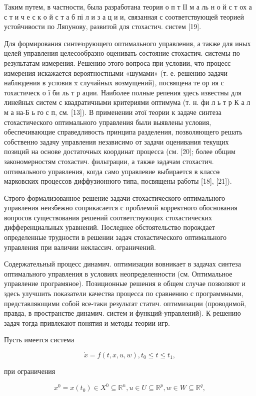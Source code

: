 \documentclass[10pt]{article}
\begin{document}
Таким путем, в частности, была разработана теория $о$ п т ІІ м а ль н о й с т ох а с т и ч е с к о й с т а б пі л и з а ц и и, связанная с соответствующей теориеӥ устоӥчивости по Ляпунову, развитой для стохастич. систем [19].

Для формирования синтезıрующего оптимального управления, а также для иных целей управления целесообразно оценивать состояние стохастич. системы по результатам измерения. Решению этого вопроса при условии, что процесс измерения искажается вероятностными «шумами» (т. е. решению задачи наблюдения в условия $\mathrm{x}$ случайных возмущений), посвящена те ор ия с тохастическ о ї би ль т р ации. Наиболее полные репения здесь известны для линейных систем с квадратичными критериями оптимума (т. н. фи л ь т р К а л м а на-Б ь го с п, см. [13]). В применении әтої теории к задаче синтеза стохастического оптимального управления были выявлены условия, обеспечивающие справедливость принципа разделения, позволяющего решать собственно задачу управления независимо от задачи оценивания текущих позиций на основе достаточных координат процесса (см. [20]; более общим закономерностям стохастич. фильтрации, а также задачам стохастич. оптимального управления, когда само управлевие выбирается в классө марковских процессов диффузионного типа, посвящены работы [18], [21]).

Строго формализованное решение задачи стохастического оптимального управления неизбежно соприкасается с проблемой корректного обоснования вопросов существования решений соответствующих стохастических дифференциальных уравнений. Последнее обстоятельство порождает определенные трудности в решении задач стохастического оптимального управления при валичии неклассич. ограничений.

Содержательный процесс динамич. оптимизации вовникает в задачах синтеза оптимального управления в условиях неопределенности (см. Оптимальное управление програмяное). Позиционные решения в общем случае позволяют и здесь улучшить показатели качества процесса по сравнению с программными, представляющими собой все-таки результат статич. оптимизации (проводимоӥ, правда, в пространстве динамич. систем и функций-управлений). К решению задач тогда привлекают понятия и методы теории игр.

Пусть имеется система

\[
\dot{x}=f(t, x, u, w), t_{0} \leqslant t \leqslant t_{1},
\]

при ограничения

\[
x^{0}=x\left(t_{0}\right) \in X^{0} \subseteq \mathbb{R}^{n}, u \in U \subseteq \mathbb{R}^{p}, w \in W \subseteq \mathbb{R}^{q},
\]
\end{document}
